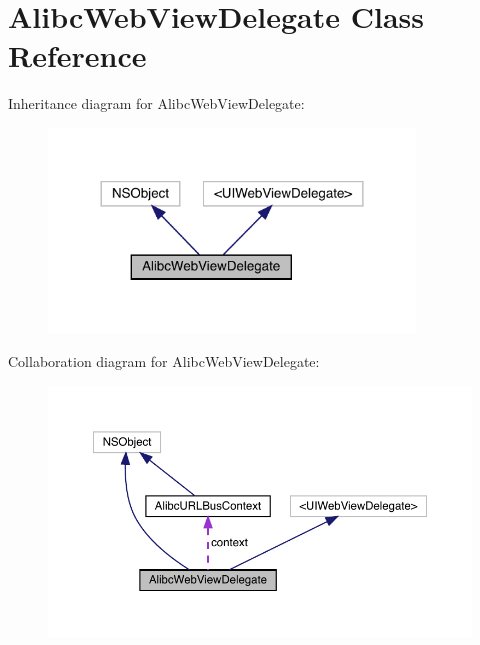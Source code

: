 \hypertarget{interface_alibc_web_view_delegate}{}\section{Alibc\+Web\+View\+Delegate Class Reference}
\label{interface_alibc_web_view_delegate}


Inheritance diagram for Alibc\+Web\+View\+Delegate\+:\nopagebreak
\begin{figure}[H]
\begin{center}
\leavevmode
\includegraphics[width=276pt]{interface_alibc_web_view_delegate__inherit__graph}
\end{center}
\end{figure}


Collaboration diagram for Alibc\+Web\+View\+Delegate\+:\nopagebreak
\begin{figure}[H]
\begin{center}
\leavevmode
\includegraphics[width=350pt]{interface_alibc_web_view_delegate__coll__graph}
\end{center}
\end{figure}
